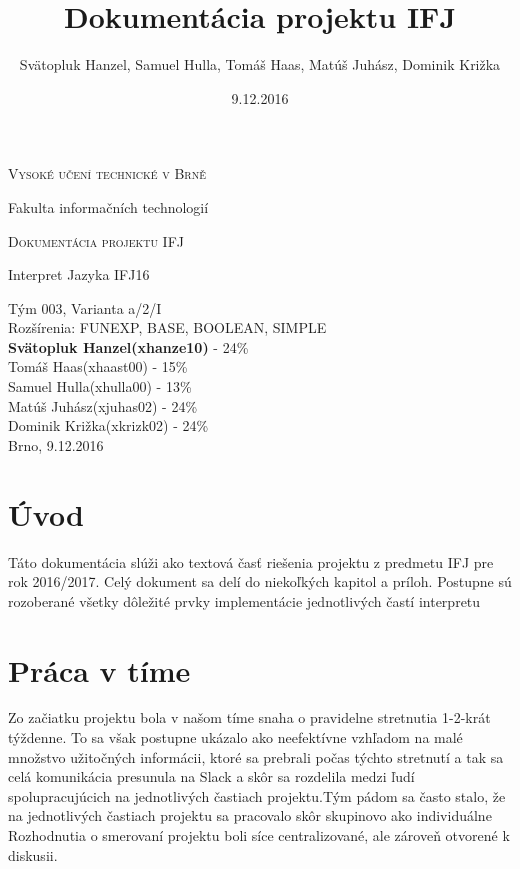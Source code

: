 \documentclass[12pt, a4paper]{article}
\title{Dokumentácia projektu IFJ}
\author{Svätopluk Hanzel, Samuel Hulla, Tomáš Haas, Matúš Juhász, Dominik Križka}
\date{9.12.2016}
\begin{document}
    \begin{titlepage}
        \begin{center}
        {\scshape\LARGE Vysoké učení technické v Brně \par}
        {\Large Fakulta informačních technologií\par}
        \vspace{3cm}
        {\scshape\LARGE Dokumentácia projektu IFJ\par}
        {\Large Interpret Jazyka IFJ16 \par}
        \vspace{2cm}
        {\Large Tým 003, Varianta a/2/I}\\
        Rozšírenia: FUNEXP, BASE, BOOLEAN, SIMPLE\\
        \vfill
        \textbf{Svätopluk Hanzel(xhanze10)} - 24\% \\
        Tomáš Haas(xhaast00) - 15\% \\
        Samuel Hulla(xhulla00) - 13\% \\
        Matúš Juhász(xjuhas02) - 24\% \\
        Dominik Križka(xkrizk02) - 24\% \\
        \vspace{1cm}
        {\hfill Brno, 9.12.2016}
        \end{center}
    \end{titlepage}

    \tableofcontents{}
    \newpage
    \setcounter{page}{1}
    \section{Úvod}
    Táto dokumentácia slúži ako textová časť riešenia projektu z predmetu IFJ pre rok 2016/2017. Celý dokument sa delí do niekoľkých kapitol a príloh. Postupne sú rozoberané všetky dôležité prvky implementácie jednotlivých častí interpretu
    \section{Práca v tíme}
	    Zo začiatku projektu bola v našom tíme snaha o pravidelne stretnutia 1-2-krát týždenne. To sa však postupne ukázalo ako neefektívne vzhľadom na malé množstvo užitočných informácii, ktoré sa prebrali počas týchto stretnutí a tak sa celá komunikácia presunula na Slack a skôr sa rozdelila medzi ľudí spolupracujúcich na jednotlivých častiach projektu.Tým pádom sa často stalo, že na jednotlivých častiach projektu sa pracovalo skôr skupinovo ako individuálne \\
		 Rozhodnutia o smerovaní projektu boli síce centralizované, ale zároveň otvorené k diskusii.
\end{document}
